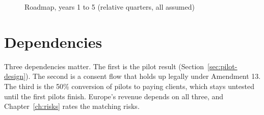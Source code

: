 \begin{figure}[tbp]

\caption{Roadmap, years 1 to 5 (relative quarters, all assumed)}\label{fig:f4}
\end{figure}

\section{Dependencies}\label{sec:dependencies}
Three dependencies matter. The first is the pilot result (Section~\ref{sec:pilot-design}). The second is a consent flow that holds up legally under Amendment 13. The third is the 50\% conversion of pilots to paying clients, which stays untested until the first pilots finish. Europe's revenue depends on all three, and Chapter~\ref{ch:risks} rates the matching risks.
\ctchapterend
